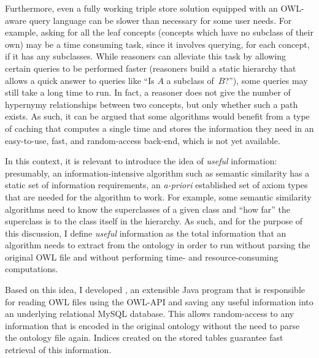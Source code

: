 
Furthermore, even a fully working triple store solution equipped with an OWL-aware query language can be slower than necessary for some user needs. For example, asking for all the leaf concepts (concepts which have no subclass of their own) may be a time consuming task, since it involves querying, for each concept, if it has any subclasses. While reasoners can alleviate this task by allowing certain queries to be performed faster (\eg reasoners build a static hierarchy that allows a quick answer to queries like ``Is $A$ a subclass of~$B$?''), some queries may still take a long time to run. In fact, a reasoner does not give the number of hypernymy relationships between two concepts, but only whether such a path exists. As such, it can be argued that some algorithms would benefit from a type of caching that computes a single time and stores the information they need in an easy-to-use, fast, and random-access back-end, which is not yet available.

In this context, it is relevant to introduce the idea of \emph{useful} information: presumably, an information-intensive algorithm such as semantic similarity has a static set of information requirements, an \emph{a-priori} established set of axiom types that are needed for the algorithm to work. For example, some semantic similarity algorithms need to know the superclasses of a given class and ``how far'' the superclass is to the class itself in the hierarchy. As such, and for the purpose of this discussion, I define \emph{useful} information as the total information that an algorithm needs to extract from the ontology in order to run without parsing the original OWL file and without performing time- and resource-consuming computations.

Based on this idea, I developed \owlsql, an extensible Java program that is responsible for reading OWL files using the OWL-API and saving any useful information into an underlying relational MySQL database. This allows random-access to any information that is encoded in the original ontology without the need to parse the ontology file again. Indices created on the stored tables guarantee fast retrieval of this information.

